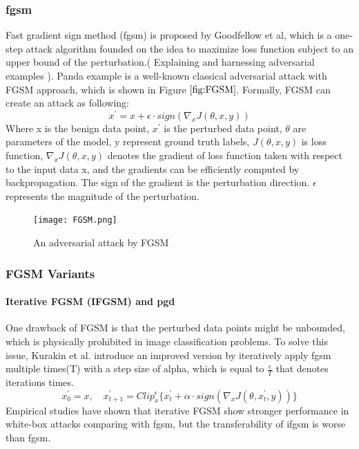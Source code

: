 \subsubsection{\acrshort{fgsm}}
Fast gradient sign method (\acrshort{fgsm}) is proposed by Goodfellow et al, which is a one-step attack algorithm founded on the idea to maximize loss function subject to an upper bound of the perturbation.( Explaining and harnessing adversarial examples ). Panda example is a well-known classical adversarial attack with FGSM approach, which is shown in Figure \(\ref{fig:FGSM}\).  Formally, FGSM can create an attack as following:
\begin{equation}
          x^{'} = x + \epsilon \cdot sign(\nabla_{x}J(\theta,x,y)) 
\end{equation}
Where x is the benign data point, \(x^{'}\) is the perturbed data point, \(\theta\) are parameters of the model, y represent ground truth labels, \(J(\theta,x,y)\) is loss function, \(\nabla_{x}J(\theta,x,y)\) denotes the gradient of loss function taken with respect to the input data x, and the gradients can be efficiently computed by backpropagation. The sign of the gradient is the perturbation direction. \(\epsilon\) represents the magnitude of the perturbation.
\begin{figure}[!htbp]
\centering
\texttt{[image: FGSM.png]}
\caption{An adversarial attack by FGSM}
\label{fig:FGSM}
\end{figure}

\subsubsection{FGSM Variants}
\paragraph{Iterative FGSM (IFGSM) and \acrshort{pgd}} 
One drawback of FGSM is that the perturbed data points might be unbounded, which is physically prohibited in image classification problems. To solve this issue,  Kurakin et al.\cite{kurakin_adversarial_2017} introduce an improved version by iteratively apply \acrshort{fgsm} multiple times(T) with a step size of alpha, which is equal to \(\frac{\epsilon}{T}\) that denotes iterations times.
\begin{equation}
          x^{'}_{0} = x, \quad x_{t+1}^{'}=Clip^{\epsilon}_{x}\{x_{t}^{'}+\alpha \cdot sign(\nabla_{x}J(\theta,x_{t}^{'},y))\} 
\end{equation}
Empirical studies have shown that iterative FGSM show stronger performance in white-box attacks comparing with \acrshort{fgsm}, but the transferability of \acrshort{ifgsm} is worse than \acrshort{fgsm}\cite{kurakinAdversarialMachineLearning2017,tramer_ensemble_2020}.

